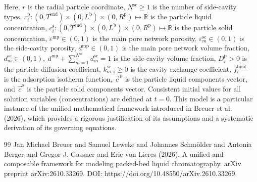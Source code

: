 \documentclass{article}
\begin{document}
Here, $r$ is the radial particle coordinate, $N^{\mathrm{sc}}\geq 1$ is the number of side-cavity types, $c^{\mathrm{p}}_{i}\colon (0, T^{\mathrm{end}}) \times (0, L^{\mathrm{b}})\times (0, R^{\mathrm{p}}) \mapsto \mathbb{R}$ is the particle liquid concentration, $c^{\mathrm{s}}_{i}\colon (0, T^{\mathrm{end}}) \times (0, L^{\mathrm{b}})\times (0, R^{\mathrm{p}}) \mapsto \mathbb{R}$ is the particle solid concentration, $\varepsilon^{\mathrm{mp}}\in (0, 1)$ is the main pore network porosity, $\varepsilon^{\mathrm{sc}}_{m}\in (0, 1)$ is the side-cavity porosity, $d^{\mathrm{mp}}\in (0, 1)$ is the main pore network volume fraction, $d^{\mathrm{sc}}_{m}\in (0, 1), \; d^{\mathrm{mp}} + \sum_{m=1}^{N^{\mathrm{sc}}} d^{\mathrm{sc}}_{m} = 1$ is the side-cavity volume fraction, $D^{\mathrm{p}}_{i}> 0$ is the particle diffusion coefficient, $k^{\mathrm{sc}}_{m,i}\geq 0$ is the cavity exchange coefficient, $f^{\mathrm{bind}}_{i}$ is the adsorption isotherm function, $\vec{c}^{\mathrm{p}}$ is the particle liquid components vector, and $\vec{c}^{\mathrm{s}}$ is the particle solid components vector.
Consistent initial values for all solution variables (concentrations) are defined at $t = 0$.
This model is a particular instance of the unified mathematical framework introduced in Breuer et al. (2026), which provides a rigorous justification of its assumptions and a systematic derivation of its governing equations.
\begin{thebibliography}{99}
     Jan Michael Breuer and Samuel Leweke and Johannes Schmölder and Antonia Berger and Gregor J. Gassner and Eric von Lieres (2026). A unified and composable framework for modeling packed-bed liquid chromatography. arXiv preprint arXiv:2610.33269. DOI: https://doi.org/10.48550/arXiv.2610.33269.
\end{thebibliography}
\end{document}
